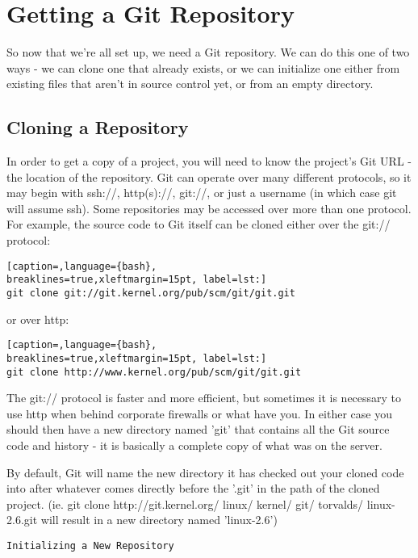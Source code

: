 \section{Getting a Git Repository}
So now that we're all set up, we need a Git repository. We can do this one of
two ways - we can clone one that already exists, or we can initialize one
either from existing files that aren't in source control yet, or from an empty
directory.

\subsection{Cloning a Repository}
In order to get a copy of a project, you will need to know the project's Git
URL - the location of the repository. Git can operate over many different
protocols, so it may begin with ssh://, http(s)://, git://, or just a username
(in which case git will assume ssh). Some repositories may be accessed over
more than one protocol. For example, the source code to Git itself can be
cloned either over the git:// protocol:
\lstset{basicstyle=\scriptsize, numbers=none, captionpos=b, tabsize=4}
\begin{lstlisting}[caption=,language={bash},
breaklines=true,xleftmargin=15pt, label=lst:]
git clone git://git.kernel.org/pub/scm/git/git.git
\end{lstlisting}

or over http:
\lstset{basicstyle=\scriptsize, numbers=none, captionpos=b, tabsize=4}
\begin{lstlisting}[caption=,language={bash},
breaklines=true,xleftmargin=15pt, label=lst:]
git clone http://www.kernel.org/pub/scm/git/git.git
\end{lstlisting}

The git:// protocol is faster and more efficient, but sometimes it is necessary
to use http when behind corporate firewalls or what have you. In either case
you should then have a new directory named 'git' that contains all the Git
source code and history - it is basically a complete copy of what was on the
server.

By default, Git will name the new directory it has checked out your cloned code
into after whatever comes directly before the '.git' in the path of the cloned
project. (ie. git clone http://git.kernel.org/ linux/ kernel/ git/ torvalds/
linux-2.6.git will result in a new directory named 'linux-2.6')
\scriptsize
\begin{verbatim}
Initializing a New Repository
\end{verbatim}
\normalsize

